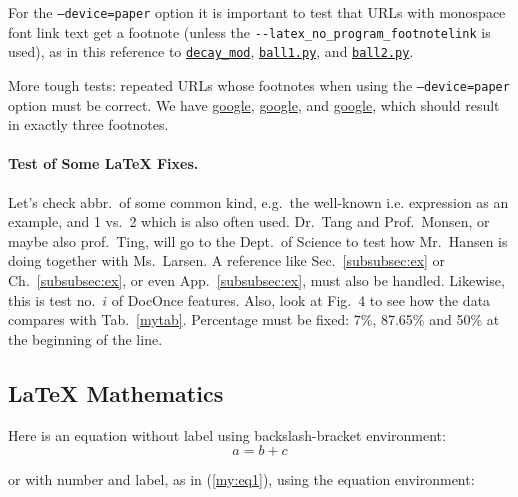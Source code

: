 \documentclass[%
oneside,                 %
final,                   %
10pt]{article}
\theoremstyle{definition}
\begin{document}
\begin{enumerate}
For the \texttt{--device=paper} option it is important to test that URLs with
monospace font link text get a footnote
(unless the \Verb!--latex_no_program_footnotelink!
is used), as in this reference to
\href{{https://github.com/hplgit/INF5620/tree/gh-pages/src/decay/experiments/decay_mod.py}}{\nolinkurl{decay_mod}}, \href{{https://tinyurl.com/pwyasaa/formulas.ball1.py}}{\nolinkurl{ball1.py}},
and \href{{https://tinyurl.com/pwyasaa/formulas.ball2.py}}{\nolinkurl{ball2.py}}.



More tough tests: repeated URLs whose footnotes when using the
\texttt{--device=paper} option must be correct. We have
\href{{https://google.com}}{google}, \href{{https://google.com}}{google}, and
\href{{https://google.com}}{google}, which should result in exactly three
footnotes.

\paragraph{Test of Some {\LaTeX} Fixes.}
Let's check abbr.~of some common kind, e.g.~the well-known i.e.
expression as an example, and 1 vs.~2 which is also often used.
Dr.~Tang and Prof.~Monsen, or maybe also prof.~Ting,
will go to the Dept.~of Science to test how Mr.~Hansen is doing together
with Ms.~Larsen. A reference like Sec.~\vref{subsubsec:ex} or
Ch.~\vref{subsubsec:ex}, or even App.~\vref{subsubsec:ex}, must also be
handled. Likewise, this is test no.~$i$ of DocOnce features.
Also, look at Fig.~4 to see how the data compares with Tab.~\vref{mytab}.
Percentage must be fixed: 7\%,  87.65\% and
50\% at the beginning of the line.


\subsection{{\LaTeX} Mathematics}

Here is an equation without label using backslash-bracket environment:
\[ a = b + c \]

or with number and label, as in (\ref{my:eq1}), using the equation environment:


\end{enumerate}
\end{document}
